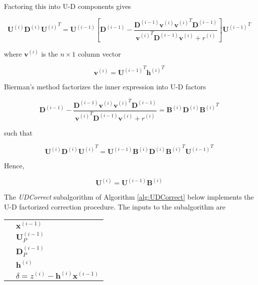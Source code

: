 Factoring this into U-D components gives

\begin{equation*}
    \mathbf{U}^{(i)} \mathbf{D}^{(i)} {\mathbf{U}^{(i)}}^T 
    = \mathbf{U}^{(i-1)}
    \left[ \mathbf{D}^{(i-1)}
    - \frac { \mathbf{D}^{(i-1)} \mathbf{v}^{(i)} {\mathbf{v}^{(i)}}^T \mathbf{D}^{(i-1)}} { {\mathbf{v}^{(i)}}^T  \mathbf{D}^{(i-1)} \mathbf{v}^{(i)} + r^{(i)} } \right]
    {\mathbf{U}^{(i-1)}}^T
\end{equation*}

where $\mathbf{v}^{(i)}$ is the $n \times 1$ column vector

\begin{equation*}
    \mathbf{v}^{(i)} = {\mathbf{U}^{(i-1)}}^T {\mathbf{h}^{(i)}}^T
\end{equation*}

Bierman’s method factorizes the inner expression into U-D factors

\begin{equation*}
    \mathbf{D}^{(i-1)}
    - \frac { \mathbf{D}^{(i-1)} \mathbf{v}^{(i)} {\mathbf{v}^{(i)}}^T \mathbf{D}^{(i-1)}} { {\mathbf{v}^{(i)}}^T  \mathbf{D}^{(i-1)} \mathbf{v}^{(i)} + r^{(i)} }
    = \mathbf{B}^{(i)} \mathbf{D}^{(i)} {\mathbf{B}^{(i)}}^T
\end{equation*}

such that

\begin{equation*}
    \mathbf{U}^{(i)} \mathbf{D}^{(i)} {\mathbf{U}^{(i)}}^T = \mathbf{U}^{(i-1)} \mathbf{B}^{(i)} \mathbf{D}^{(i)} {\mathbf{B}^{(i)}}^T {\mathbf{U}^{(i-1)}}^T
\end{equation*}

Hence,

\begin{equation*}
    \mathbf{U}^{(i)} = \mathbf{U}^{(i-1)} \mathbf{B}^{(i)}
\end{equation*}

The \textit{UDCorrect} subalgorithm of Algorithm \ref{alg:UDCorrect} below implements the
U-D factorized correction procedure. The inputs to the subalgorithm are

\begin{tabular}{l l}
\phantom{.} & $\mathbf{x}^{(i-1)}$ \\
\phantom{.} & $\mathbf{U}_P^{(i-1)}$ \\
\phantom{.} & $\mathbf{D}_P^{(i-1)}$ \\
\phantom{.} & $\mathbf{h}^{(i)}$ \\
\phantom{.} & ${\delta} = {z}^{(i)} - \mathbf{h}^{(i)} \mathbf{x}^{(i-1)}$
\end{tabular}

